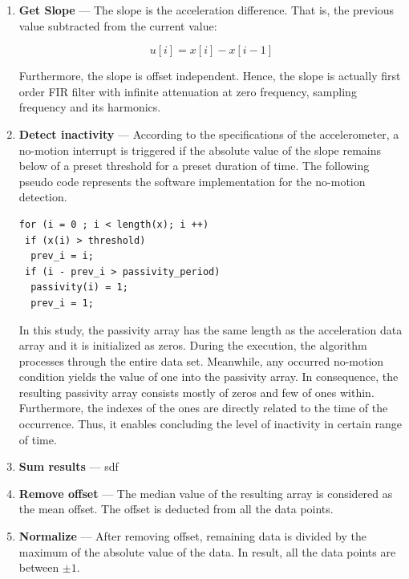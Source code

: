 \documentclass[english,12pt,a4paper,pdftex,elec,utf8]{aaltothesis}
\newcommand{\Clanguage}{\lstset{
  language=C++,                %
  basicstyle=\ttfamily,
  title=\lstname,                 %
}}
\begin{document}
\begin{enumerate}
\item \textbf{Get Slope} --- The slope is the acceleration difference. That is, the previous value subtracted from the current value: 

\begin{equation}
u[i] = x[i] - x[i-1]
\end{equation}

Furthermore, the slope is offset independent. Hence, the slope is actually first order FIR filter with infinite attenuation at zero frequency, sampling frequency and its harmonics. \\

\item \textbf{Detect inactivity} --- According to the specifications of the accelerometer, a no-motion interrupt is triggered if the absolute value of the slope remains below of a preset threshold for a preset duration of time. The following pseudo code represents the software implementation for the no-motion detection. \\

\Clanguage
\begin{lstlisting}
for (i = 0 ; i < length(x); i ++)
 if (x(i) > threshold)	
  prev_i = i;
 if (i - prev_i > passivity_period)
  passivity(i) = 1;
  prev_i = 1;	
\end{lstlisting}

In this study, the passivity array has the same length as the acceleration data array and it is initialized as zeros. During the execution, the algorithm processes through the entire data set. Meanwhile, any occurred no-motion condition yields the value of one into the passivity array. In consequence, the resulting passivity array consists mostly of zeros and few of ones within. Furthermore, the indexes of the ones are directly related to the time of the occurrence. Thus, it enables concluding the level of inactivity in certain range of time. \\


\item \textbf{Sum results} --- sdf

\item \textbf{Remove offset} --- The median value of the resulting array is considered as the mean offset. The offset is deducted from all the data points.

\item \textbf{Normalize} --- After removing offset, remaining data is divided by the maximum of the absolute value of the data. In result, all the data points are between $\pm 1$.


\end{enumerate}
\end{document}

